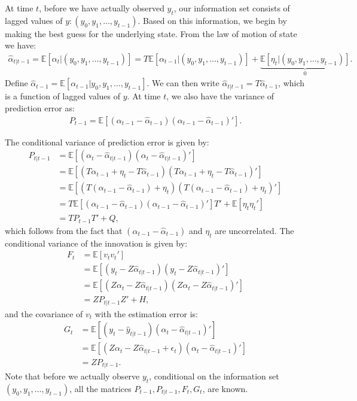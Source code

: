 \documentclass{article}
\begin{document}
	At time $t$, before we have actually observed $y_t$, our information set consists of lagged values of $y: (y_0, y_1, \dots, y_{t-1}).$ Based on this information, we begin by making the best guess for the underlying state. From the law of motion of state we have:
	\begin{align*}
		\hat{\alpha}_{t|t-1} = \mathds{E}[\alpha_t | (y_0, y_1, \dots, y_{t-1}) ] = T\mathds{E}[\alpha_{t-1}|(y_0, y_1, \dots, y_{t-1})] + 				\underbrace{\mathds{E}[\eta_t|(y_0, y_1, \dots, y_{t-1})]}_{0}.
	\end{align*}
	Define $\hat{\alpha}_{t-1} = \mathds{E}[\alpha_{t-1}| y_0, y_1, \dots , y_{t-1}]$. We can then write $\hat{\alpha}_{t|t-1} = T\hat{\alpha}_{t-1}$, which is a function of lagged values of $y$. At time $t$, we also have the variance of prediction error as:
	\begin{align*}
		P_{t-1} = \mathds{E}[(\alpha_{t-1} - \hat{\alpha}_{t-1})(\alpha_{t-1} - \hat{\alpha}_{t-1})'].
	\end{align*}
	
	The conditional variance of prediction error is given by:
	\begin{align*}
		P_{t|t-1} &  = \mathds{E}[(\alpha_t - \hat{\alpha}_{t|t-1})(\alpha_t - \hat{\alpha}_{t|t-1})']\\
		& = \mathds{E}[(T\alpha_{t-1} + \eta_t - T\hat{\alpha}_{t-1})(T\alpha_{t-1} + \eta_t - T\hat{\alpha}_{t-1})']\\
		& = \mathds{E}[(T(\alpha_{t-1}-\hat{\alpha}_{t-1})+ \eta_t)(T(\alpha_{t-1}-\hat{\alpha}_{t-1})+ \eta_t)'] \\
		& = T\mathds{E}[(\alpha_{t-1}-\hat{\alpha}_{t-1})(\alpha_{t-1}-\hat{\alpha}_{t-1})']T'+ \mathds{E}[\eta_t\eta_t']\\
		& = TP_{t-1}T' + Q,
	\end{align*}
	which follows from the fact that $(\alpha_{t-1}-\hat{\alpha}_{t-1})$ and $\eta_t$ are uncorrelated. The conditional variance of the innovation is given by: 
	\begin{align*}
		F_t & = \mathds{E}[v_t v_t'] \\
		& = \mathds{E}[(y_t - Z \hat{\alpha}_{t|t-1})(y_t - Z \hat{\alpha}_{t|t-1})']\\
		& = \mathds{E}[(Z \alpha_t - Z \hat{\alpha}_{t|t-1})( Z \alpha_t - Z \hat{\alpha}_{t|t-1})']\\
		& = Z P_{t|t-1}Z' + H,
	\end{align*}
	and the covariance of $v_t$ with the estimation error is:
	\begin{align*}
		G_t & = \mathds{E}[(y_t - \hat{y}_{t|t-1})(\alpha_t - \hat{\alpha}_{t|t-1})']\\
		& = \mathds{E}[(Z\alpha_t - Z\hat{\alpha}_{t|t-1} + \epsilon_t)(\alpha_t - \hat{\alpha}_{t|t-1})'] \\
		& = ZP_{t|t-1}.
	\end{align*}
	Note that before we actually observe $y_t$, conditional on the information set $(y_0, y_1, \dots, y_{t-1})$, all the matrices $P_{t-1}, P_{t|t-1}, F_t, G_t$, are known. \\
\end{document}

